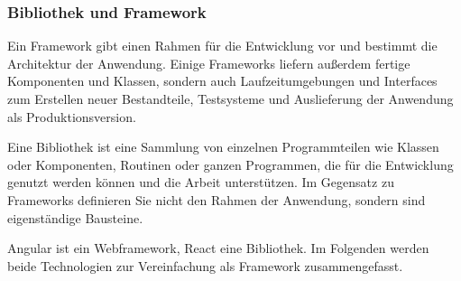 \subsubsection{Bibliothek und Framework}
Ein Framework gibt einen Rahmen für die Entwicklung vor und bestimmt die Architektur der Anwendung. Einige Frameworks liefern außerdem fertige Komponenten und Klassen, sondern auch Laufzeitumgebungen und Interfaces zum Erstellen neuer Bestandteile, Testsysteme und Auslieferung der Anwendung als Produktionsversion.

Eine Bibliothek ist eine Sammlung von einzelnen Programmteilen wie Klassen oder Komponenten, Routinen oder ganzen Programmen, die für die Entwicklung genutzt werden können und die Arbeit unterstützen. Im Gegensatz zu Frameworks definieren Sie nicht den Rahmen der Anwendung, sondern sind eigenständige Bausteine.

Angular ist ein Webframework, React eine Bibliothek. Im Folgenden werden beide Technologien zur Vereinfachung als Framework zusammengefasst.